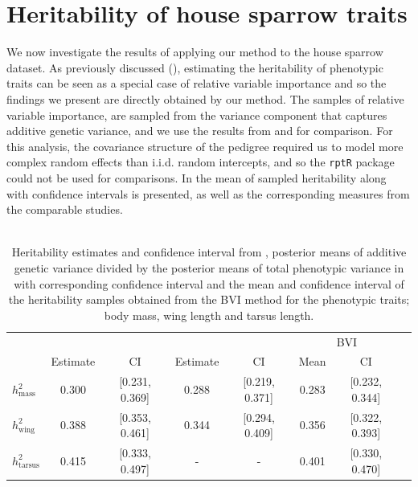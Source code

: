 \section{Heritability of house sparrow traits}
We now investigate the results of applying our method to the house sparrow dataset. As previously discussed (), estimating the heritability of phenotypic traits can be seen as a special case of relative variable importance and so the findings we present are directly obtained by our method. The samples of relative variable importance, are sampled from the variance component that captures additive genetic variance, and we use the results from \citet{Silva2017} and \citet{Muff2019Genetic} for comparison. For this analysis, the covariance structure of the pedigree required us to model more complex random effects than i.i.d. random intercepts, and so the \texttt{rptR} package could not be used for comparisons. In  the mean of sampled heritability along with confidence intervals is presented, as well as the corresponding measures from the comparable studies.
\\
\\
\begin{table}[H]
  \centering
  \begin{tabular}{lccccccc}
  \toprule
   & \multicolumn{2}{c}{\citet{Silva2017}} & \multicolumn{2}{c}{\citet{Muff2019Genetic}} & \multicolumn{2}{c}{BVI} \\ 
   \cmidrule(lr){2-3} \cmidrule(lr){4-5} \cmidrule(lr){6-7}
   & Estimate & CI & Estimate & CI & Mean & CI \\ 
  \midrule
  $h^2_{\text{mass}}$    & 0.300 & [0.231, 0.369] & 0.288 & [0.219, 0.371] & 0.283 & [0.232, 0.344] \\
  $h^2_{\text{wing}}$    & 0.388 & [0.353, 0.461] & 0.344 & [0.294, 0.409] & 0.356 & [0.322, 0.393] \\
  $h^2_{\text{tarsus}}$  & 0.415 & [0.333, 0.497] & - & - & 0.401 & [0.330, 0.470] \\ 
  \bottomrule
  \end{tabular}
  \caption[Heritability estimates and confidence intervals]{Heritability estimates and confidence interval from \citet{Silva2017}, posterior means of additive genetic variance divided by the posterior means of total phenotypic variance in \citet{Muff2019Genetic} with corresponding confidence interval and the mean and confidence interval of the heritability samples obtained from the BVI method for the phenotypic traits; body mass, wing length and tarsus length.}
  \label{table:summary_heritability}
\end{table}
